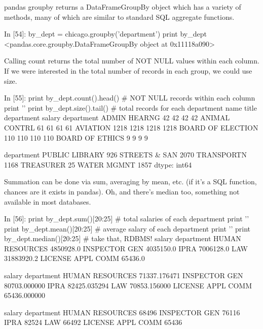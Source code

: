 pandas groupby returns a DataFrameGroupBy object which has a variety of methods, many of which are similar to standard SQL aggregate functions.

In [54]:
by_dept = chicago.groupby('department')
print by_dept
<pandas.core.groupby.DataFrameGroupBy object at 0x11118a090>

Calling count returns the total number of NOT NULL values within each column. If we were interested in the total number of records in each group, we could use size.

In [55]:
print by_dept.count().head() # NOT NULL records within each column
print '\n'
print by_dept.size().tail() # total records for each department
                   name  title  department  salary
department                                        
ADMIN HEARNG         42     42          42      42
ANIMAL CONTRL        61     61          61      61
AVIATION           1218   1218        1218    1218
BOARD OF ELECTION   110    110         110     110
BOARD OF ETHICS       9      9           9       9


department
PUBLIC LIBRARY     926
STREETS & SAN     2070
TRANSPORTN        1168
TREASURER           25
WATER MGMNT       1857
dtype: int64

Summation can be done via sum, averaging by mean, etc. (if it's a SQL function, chances are it exists in pandas). Oh, and there's median too, something not available in most databases.

In [56]:
print by_dept.sum()[20:25] # total salaries of each department
print '\n'
print by_dept.mean()[20:25] # average salary of each department
print '\n'
print by_dept.median()[20:25] # take that, RDBMS!
                       salary
department                   
HUMAN RESOURCES     4850928.0
INSPECTOR GEN       4035150.0
IPRA                7006128.0
LAW                31883920.2
LICENSE APPL COMM     65436.0


                         salary
department                     
HUMAN RESOURCES    71337.176471
INSPECTOR GEN      80703.000000
IPRA               82425.035294
LAW                70853.156000
LICENSE APPL COMM  65436.000000


                   salary
department               
HUMAN RESOURCES     68496
INSPECTOR GEN       76116
IPRA                82524
LAW                 66492
LICENSE APPL COMM   65436